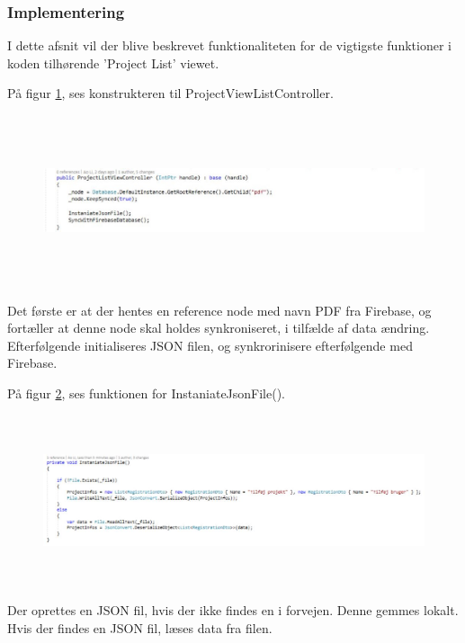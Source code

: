 \clearpage

\subsubsection{Implementering}
I dette afsnit vil der blive beskrevet funktionaliteten for de vigtigste funktioner i koden tilhørende 'Project List' viewet.

På figur \ref{fig:ProjectListViewController}, ses konstrukteren til ProjectViewListController.
\begin{figure}[H] %
	\centering
	\includegraphics[height=5cm, width=17cm]{../ArkitekturDesign/Design/ProjectList/ProjectListViewController}
	\caption{}
	\label{fig:ProjectListViewController}
\end{figure}
Det første er at der hentes en reference node med navn PDF fra Firebase, og fortæller at denne node skal holdes synkroniseret, i tilfælde af data ændring. \\
Efterfølgende initialiseres JSON filen, og synkrorinisere efterfølgende med Firebase.

På figur \ref{fig:JSONFile}, ses funktionen for InstaniateJsonFile().
\begin{figure}[H] %
	\centering
	\includegraphics[height=5cm, width=15cm]{../ArkitekturDesign/Design/ProjectList/JSONFile}
	\caption{}
	\label{fig:JSONFile}
\end{figure}
Der oprettes en JSON fil, hvis der ikke findes en i forvejen. Denne gemmes lokalt.\\
Hvis der findes en JSON fil, læses data fra filen.

